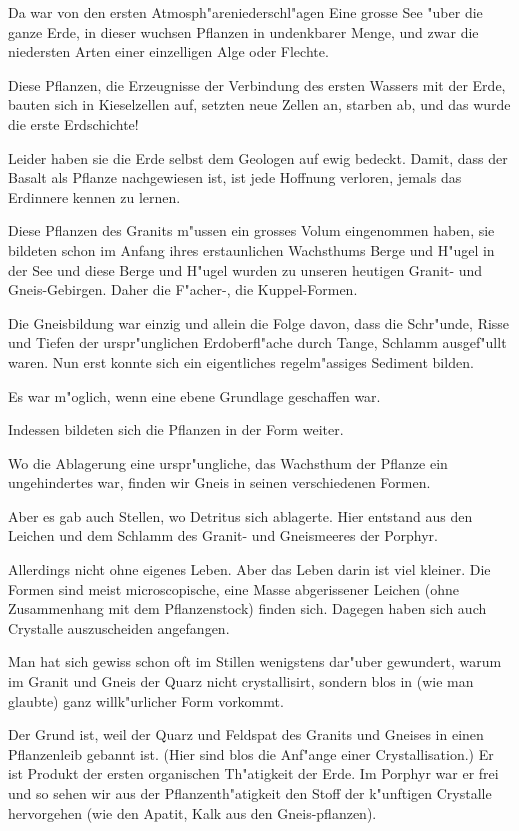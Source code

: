 \documentclass[a4paper, 11pt, oneside, german]{article}
\begin{document}
Da war von den ersten Atmosph"areniederschl"agen Eine grosse See "uber die ganze Erde, in dieser wuchsen Pflanzen in undenkbarer Menge, und zwar die niedersten Arten einer einzelligen Alge oder Flechte.

Diese Pflanzen, die Erzeugnisse der Verbindung des ersten Wassers mit der Erde, bauten sich in Kieselzellen auf, setzten neue Zellen an, starben ab, und das wurde die erste Erdschichte!

Leider haben sie die Erde selbst dem Geologen auf ewig bedeckt. Damit, dass der Basalt als Pflanze nachgewiesen ist, ist jede Hoffnung verloren, jemals das Erdinnere kennen zu lernen.

Diese Pflanzen des Granits m"ussen ein grosses Volum eingenommen haben, sie bildeten schon im Anfang ihres erstaunlichen Wachsthums Berge und H"ugel in der See und diese Berge und H"ugel wurden zu unseren heutigen Granit- und Gneis-Gebirgen. Daher die F"acher-, die Kuppel-Formen.

Die Gneisbildung war einzig und allein die Folge davon, dass die Schr"unde, Risse und Tiefen der urspr"unglichen Erdoberfl"ache durch Tange, Schlamm ausgef"ullt waren. Nun erst konnte sich ein eigentliches regelm"assiges Sediment bilden.

Es war m"oglich, wenn eine ebene Grundlage geschaffen war.

Indessen bildeten sich die Pflanzen in der Form weiter.

Wo die Ablagerung eine urspr"ungliche, das Wachsthum der Pflanze ein ungehindertes war, finden wir Gneis in seinen verschiedenen Formen.

Aber es gab auch Stellen, wo Detritus sich ablagerte. Hier entstand aus den Leichen und dem Schlamm des Granit- und Gneismeeres der Porphyr.

Allerdings nicht ohne eigenes Leben. Aber das Leben darin ist viel kleiner. Die Formen sind meist microscopische, eine Masse abgerissener Leichen (ohne Zusammenhang mit dem Pflanzenstock) finden sich. Dagegen haben sich auch Crystalle auszuscheiden angefangen.

Man hat sich gewiss schon oft im Stillen wenigstens dar"uber gewundert, warum im Granit und Gneis der Quarz nicht crystallisirt, sondern blos in (wie man glaubte) ganz willk"urlicher Form vorkommt.

Der Grund ist, weil der Quarz und Feldspat des Granits und Gneises in einen Pflanzenleib gebannt ist. (Hier sind blos die Anf"ange einer Crystallisation.) Er ist Produkt der ersten organischen Th"atigkeit der Erde. Im Porphyr war er frei und so sehen wir aus der Pflanzenth"atigkeit den Stoff der k"unftigen Crystalle hervorgehen (wie den Apatit, Kalk aus den Gneis-pflanzen).
\end{document}
